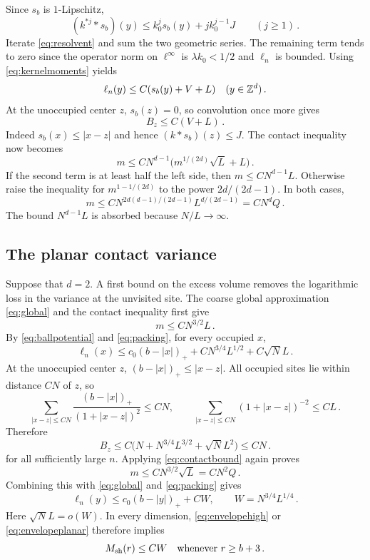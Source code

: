 Since $s_b$ is $1$-Lipschitz,
\[
 (k^{*j}*s_b)(y)\leq k_0^j s_b(y)+j k_0^{j-1}J\qquad(j\geq1)\, .
\]
Iterate \eqref{eq:resolvent} and sum the two geometric series. The remaining
term tends to zero since the operator norm on $\ell^\infty$ is
$\lambda k_0<1/2$ and $\ell_n$ is bounded.
Using \eqref{eq:kernelmoments} yields
\begin{equation}\label{eq:envelopehigh}
 \ell_n(y)\leq C(s_b(y)+V+L)\quad(y\in\mathbb Z^d)\, .
\end{equation}
At the unoccupied center $z$, $s_b(z)=0$, so convolution once more gives
\begin{equation}\label{eq:holebracket}
 B_z\leq C(V+L)\, .
\end{equation}
Indeed $s_b(x)\leq|x-z|$ and hence $(k*s_b)(z)\leq J$.
The contact inequality now becomes
\[
 m\leq CN^{d-1}\big(m^{1/(2d)}\sqrt L+L\big)\, .
\]
If the second term is at least half the left side, then
$m\leq CN^{d-1}L$. Otherwise raise the inequality for
$m^{1-1/(2d)}$ to the power $2d/(2d-1)$. In both cases,
\begin{equation}\label{eq:masshigh}
 m\leq CN^{2d(d-1)/(2d-1)}L^{d/(2d-1)}
       =CN^d Q\, .
\end{equation}
The bound $N^{d-1}L$ is absorbed because $N/L\to\infty$.

\subsection{The planar contact variance}
Suppose that $d=2$. A first bound on the excess volume removes the
logarithmic loss in the variance at the unvisited site.
The coarse global approximation \eqref{eq:global} and the contact
inequality first give
\[
 m\leq CN^{3/2}L\, .
\]
By \eqref{eq:ballpotential} and \eqref{eq:packing}, for every occupied $x$,
\[
 \ell_n(x)\leq c_0(b-|x|)_+
       +CN^{3/4}L^{1/2}+C\sqrt N L\, .
\]
At the unoccupied center $z$, $(b-|x|)_+\leq|x-z|$.
All occupied sites lie within distance $CN$ of $z$, so
\[
 \sum_{|x-z|\leq CN}\frac{(b-|x|)_+}{(1+|x-z|)^2}
 \leq CN,\qquad
 \sum_{|x-z|\leq CN}(1+|x-z|)^{-2}\leq CL\, .
\]
Therefore
\[
 B_z\leq C\big(N+N^{3/4}L^{3/2}+\sqrt N L^2\big)
       \leq CN\, .
\]
for all sufficiently large $n$. Applying
\eqref{eq:contactbound} again proves
\begin{equation}\label{eq:massplanar}
 m\leq CN^{3/2}\sqrt L=CN^2Q\, .
\end{equation}
Combining this with \eqref{eq:global} and \eqref{eq:packing} gives
\begin{equation}\label{eq:envelopeplanar}
 \ell_n(y)\leq c_0(b-|y|)_++CW,
 \qquad W=N^{3/4}L^{1/4}\, .
\end{equation}
Here $\sqrt N L=o(W)$.
In every dimension, \eqref{eq:envelopehigh} or \eqref{eq:envelopeplanar}
therefore implies
\begin{equation}\label{eq:shellW}
 M_{\rm sh}(r)\leq CW\quad\hbox{whenever }r\geq b+3\, .
\end{equation}

